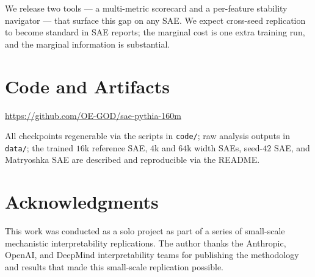 \documentclass[11pt]{article}
\begin{document}
We release two tools --- a multi-metric scorecard and a per-feature
stability navigator --- that surface this gap on any SAE. We expect
cross-seed replication to become standard in SAE reports; the marginal
cost is one extra training run, and the marginal information is
substantial.

\section*{Code and Artifacts}

\url{https://github.com/OE-GOD/sae-pythia-160m}

All checkpoints regenerable via the scripts in \texttt{code/}; raw
analysis outputs in \texttt{data/}; the trained $16$k reference SAE,
$4$k and $64$k width SAEs, seed-$42$ SAE, and Matryoshka SAE are
described and reproducible via the README.

\section*{Acknowledgments}

This work was conducted as a solo project as part of a series of
small-scale mechanistic interpretability replications. The author thanks
the Anthropic, OpenAI, and DeepMind interpretability teams for publishing
the methodology and results that made this small-scale replication
possible.
\end{document}
